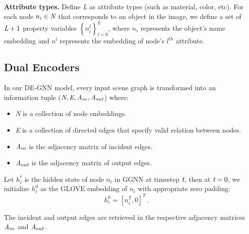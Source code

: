 \documentclass[letterpaper]{article} %
\begin{document}
\medskip
\textbf{Attribute types.} Define \emph{L} as attribute types (such as material, color, etc). 
For each node $n_i\in\emph{N}$ that corresponds to an object in the image, we define a set of $\emph{L}+1$ property variables ${\left\{ n_i^j\right\}}_{l=0}^L$, where $n_i$ represents the object's name embedding and $n^l$ represents the embedding of node's $l^{th}$ attribute.

\subsection{Dual Encoders}

In our DE-GNN model, every input scene graph is transformed into an information tuple ($\emph{N}, \emph{E}, \emph{A}_{in}, \emph{A}_{out}$) where:
\begin{itemize}
    \item \emph{N} is a collection of node embeddings.
    \item \emph{E} is a collection of directed edges that specify valid relation between nodes.
    \item $\emph{A}_{in}$ is the adjacency matrix of incident edges.
    \item $\emph{A}_{out}$ is the adjacency matrix of output edges.
\end{itemize}

Let $h_i^t$ is the hidden state of node $n_i$ in GGNN at timestep $\emph{t}$, then at $\emph{t}=0$, we initialize $h_i^0$ as the GLOVE embedding of $n_i$ with appropriate zero padding:
\begin{equation}
    h_i^0 = [n_i^T, 0]^T  \, .
\end{equation}

The incident and output edges are retrieved in the respective adjacency matrices $\emph{A}_{in}$ and $\emph{A}_{out}$. 

\medskip
\end{document}

